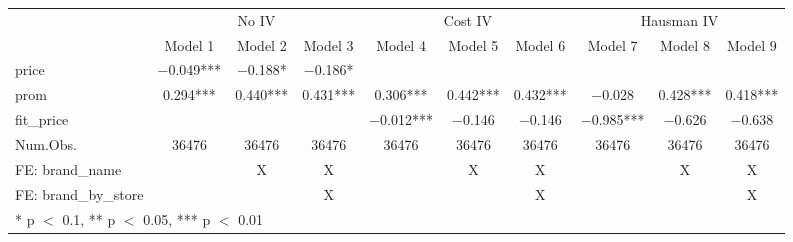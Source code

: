 \begin{table}
\centering
\begin{tabular}[t]{lccccccccc}
\toprule
\multicolumn{1}{c}{ } & \multicolumn{3}{c}{No IV} & \multicolumn{3}{c}{Cost IV} & \multicolumn{3}{c}{Hausman IV} \\
\cmidrule(l{3pt}r{3pt}){2-4} \cmidrule(l{3pt}r{3pt}){5-7} \cmidrule(l{3pt}r{3pt}){8-10}
  & Model 1 & Model 2 & Model 3 & Model 4 & Model 5 & Model 6 & Model 7 & Model 8 & Model 9\\
\midrule
price & \num{-0.049}*** & \num{-0.188}* & \num{-0.186}* &  &  &  &  &  & \\
prom & \num{0.294}*** & \num{0.440}*** & \num{0.431}*** & \num{0.306}*** & \num{0.442}*** & \num{0.432}*** & \num{-0.028} & \num{0.428}*** & \num{0.418}***\\
fit\_price &  &  &  & \num{-0.012}*** & \num{-0.146} & \num{-0.146} & \num{-0.985}*** & \num{-0.626} & \num{-0.638}\\
\midrule
Num.Obs. & \num{36476} & \num{36476} & \num{36476} & \num{36476} & \num{36476} & \num{36476} & \num{36476} & \num{36476} & \num{36476}\\
FE: brand_name &  & X & X &  & X & X &  & X & X\\
FE: brand_by_store &  &  & X &  &  & X &  &  & X\\
\bottomrule
\multicolumn{10}{l}{\rule{0pt}{1em}* p $<$ 0.1, ** p $<$ 0.05, *** p $<$ 0.01}\\
\end{tabular}
\end{table}
